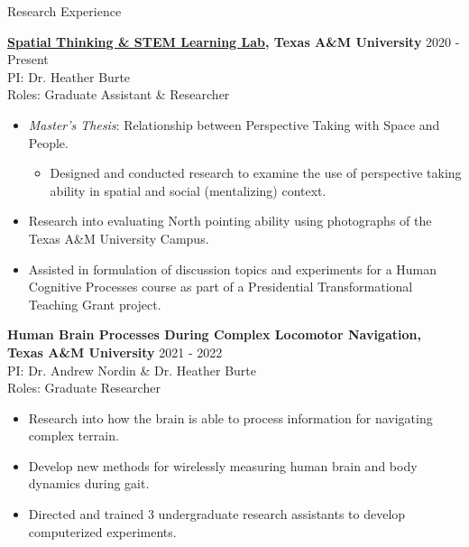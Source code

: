 \documentclass{resume} %
\begin{document}
\begin{rSection}{Research Experience}
    
    {\bf \href{https://burtelab.sites.tamu.edu/}{Spatial Thinking \& STEM 
    Learning Lab}, 
        Texas A\&M University}
    \hfill { 2020 - Present}
    \\PI: Dr. Heather Burte
    \\Roles: Graduate Assistant \& Researcher
    
    \begin{itemize}[nosep]
        
        \item \emph{Master's Thesis}: Relationship between Perspective Taking 
        with Space and People.
            \begin{itemize}
                \item Designed and conducted research to examine the use of 
                perspective taking 
                ability in spatial and social (mentalizing) context.
            \end{itemize}
        \item Research into evaluating North pointing ability using photographs 
        of the Texas A\&M University Campus.
        \item Assisted in formulation of discussion topics and experiments for 
        a Human Cognitive Processes course as part of a Presidential 
        Transformational Teaching Grant project.
        
    \end{itemize}
    
    {\bf {Human Brain Processes During Complex Locomotor Navigation},
        Texas A\&M University}
    \hfill {2021 - 2022}
    \\PI: Dr. Andrew Nordin \& Dr. Heather Burte
    \\Roles: Graduate Researcher
    
    \begin{itemize}[nosep]
        
        \item Research into how the brain is able to process information for 
        navigating complex terrain.
        \item Develop new methods for wirelessly measuring human brain and body 
        dynamics during gait.
        \item Directed and trained 3 undergraduate research assistants to 
        develop computerized experiments.
        

\end{itemize}
\end{rSection}
\end{document}
